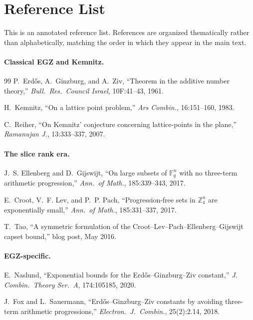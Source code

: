 \documentclass[11pt,a4paper]{article}
\theoremstyle{plain}
\theoremstyle{definition}
\theoremstyle{remark}
\newcommand{\F}{\mathbb{F}}
\newcommand{\Z}{\mathbb{Z}}
\begin{document}
\section{Reference List}

This is an annotated reference list. References are organized thematically rather than alphabetically, matching the order in which they appear in the main text.

\paragraph{Classical EGZ and Kemnitz.}

\begin{thebibliography}{99}
P.~Erd\H{o}s, A.~Ginzburg, and A.~Ziv, ``Theorem in the additive number theory,'' \emph{Bull.\ Res.\ Council Israel}, 10F:41--43, 1961.

H.~Kemnitz, ``On a lattice point problem,'' \emph{Ars Combin.}, 16:151--160, 1983.

C.~Reiher, ``On Kemnitz' conjecture concerning lattice-points in the plane,'' \emph{Ramanujan J.}, 13:333--337, 2007.

\paragraph{The slice rank era.}

J.~S. Ellenberg and D.~Gijswijt, ``On large subsets of $\F_q^n$ with no three-term arithmetic progression,'' \emph{Ann.\ of Math.}, 185:339--343, 2017.

E.~Croot, V.~F. Lev, and P.~P. Pach, ``Progression-free sets in $\Z_4^n$ are exponentially small,'' \emph{Ann.\ of Math.}, 185:331--337, 2017.

T.~Tao, ``A symmetric formulation of the Croot--Lev--Pach--Ellenberg--Gijswijt capset bound,'' blog post, May 2016.

\paragraph{EGZ-specific.}

E.~Naslund, ``Exponential bounds for the Erd\H{o}s--Ginzburg--Ziv constant,'' \emph{J. Combin.\ Theory Ser.\ A}, 174:105185, 2020.

J.~Fox and L.~Sauermann, ``Erd\H{o}s--Ginzburg--Ziv constants by avoiding three-term arithmetic progressions,'' \emph{Electron.\ J.\ Combin.}, 25(2):2.14, 2018.


\end{thebibliography}
\end{document}
